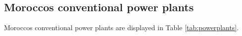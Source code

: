 

\subsection{Moroccos conventional power plants}
Moroccos conventional power plants are displayed in Table \ref{tab:powerplants}.

\clearpage
\onecolumn
\begin{footnotesize}
    
\end{footnotesize}
\clearpage
\twocolumn